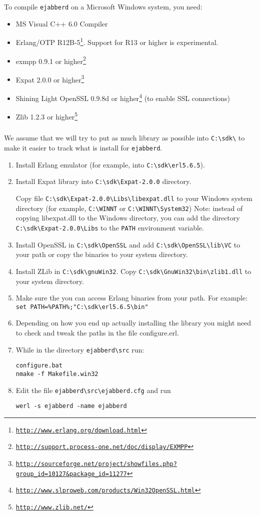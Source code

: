 \documentclass[a4paper,10pt]{book}
\newcommand{\makesubsubsection}[2]{ \aname{#1}{} \subsubsection{\ahrefloc{#1}{#2}} \label{#1} }
\newcommand{\ejabberd}{\texttt{ejabberd}}
\gdef\footahref#1#2{#2\footnote{\href{#1}{\texttt{#1}}}}
\begin{document}
To compile \ejabberd{} on a Microsoft Windows system, you need:
\begin{itemize}
\item MS Visual C++ 6.0 Compiler
\item \footahref{http://www.erlang.org/download.html}{Erlang/OTP R12B-5}. Support for R13 or higher is experimental.
\item \footahref{http://support.process-one.net/doc/display/EXMPP}{exmpp 0.9.1 or higher}
\item \footahref{http://sourceforge.net/project/showfiles.php?group\_id=10127\&package\_id=11277}{Expat 2.0.0 or higher}
\item \footahref{http://www.slproweb.com/products/Win32OpenSSL.html}{Shining Light OpenSSL 0.9.8d or higher}
(to enable SSL connections)
\item \footahref{http://www.zlib.net/}{Zlib 1.2.3 or higher}
\end{itemize}


\makesubsubsection{windowscom}{Compilation}

We assume that we will try to put as much library as possible into \verb|C:\sdk\| to make it easier to track what is install for \ejabberd{}.

\begin{enumerate}
\item Install Erlang emulator (for example, into \verb|C:\sdk\erl5.6.5|).
\item Install Expat library into \verb|C:\sdk\Expat-2.0.0|
  directory.

  Copy file \verb|C:\sdk\Expat-2.0.0\Libs\libexpat.dll|
  to your Windows system directory (for example, \verb|C:\WINNT| or
  \verb|C:\WINNT\System32|)
  Note: instead of copying libexpat.dll to the Windows
  directory, you can add the directory \verb|C:\sdk\Expat-2.0.0\Libs|
  to the \verb|PATH| environment variable.
\item Install OpenSSL in \verb|C:\sdk\OpenSSL| and add \verb|C:\sdk\OpenSSL\lib\VC| to your path or copy the binaries to your system directory.
\item Install ZLib in \verb|C:\sdk\gnuWin32|. Copy
  \verb|C:\sdk\GnuWin32\bin\zlib1.dll| to your system directory.
\item Make sure the you can access Erlang binaries from your path. For example: \verb|set PATH=%PATH%;"C:\sdk\erl5.6.5\bin"|
\item Depending on how you end up actually installing the library you might need to check and tweak the paths in the file configure.erl.
\item While in the directory \verb|ejabberd\src| run:
\begin{verbatim}
configure.bat
nmake -f Makefile.win32
\end{verbatim}
\item Edit the file \verb|ejabberd\src\ejabberd.cfg| and run
\begin{verbatim}
werl -s ejabberd -name ejabberd
\end{verbatim}
\end{enumerate}
\end{document}
